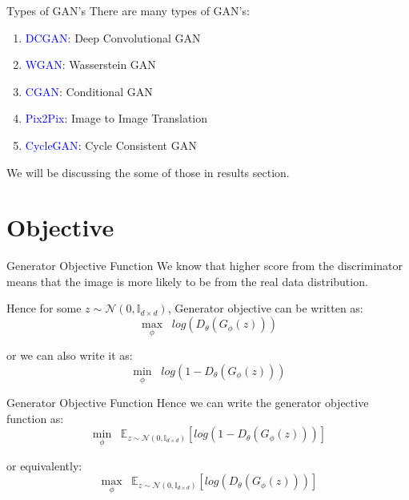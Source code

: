 \begin{frame}{Types of GAN's}
    There are many types of GAN's:
    \begin{enumerate}
        \item \textcolor{blue}{DCGAN}: Deep Convolutional GAN
        \item \textcolor{blue}{WGAN}: Wasserstein GAN
        \item \textcolor{blue}{CGAN}: Conditional GAN
        \item \textcolor{blue}{Pix2Pix}: Image to Image Translation
        \item \textcolor{blue}{CycleGAN}: Cycle Consistent GAN
    \end{enumerate}
    We will be discussing the some of those in results section.
\end{frame}

\section*{Objective}
\begin{frame}{Generator Objective Function}
    We know that higher score from the discriminator means that the image is more likely to be from the real data distribution. \\

    \bigskip

    Hence for some $z \sim \mathcal{N}(0,\mathbb{I}_{d \times d})$, Generator objective can be written as:
    \begin{equation}
        \max_{\phi} \;\; log(D_{\theta}(G_{\phi}(z)))
    \end{equation}

    or we can also write it as:
    \begin{equation}
        \min_{\phi} \;\; log(1 - D_{\theta}(G_{\phi}(z)))
    \end{equation}
\end{frame}

\begin{frame}{Generator Objective Function}
    Hence we can write the generator objective function as:
    \begin{equation}
        \min_{\phi} \;\; \mathbb{E}_{z \sim \mathcal{N}(0,\mathbb{I}_{d \times d})} \left[ log(1 - D_{\theta}(G_{\phi}(z))) \right]
    \end{equation} 

    or equivalently:
    \begin{equation}
        \max_{\phi} \;\; \mathbb{E}_{z \sim \mathcal{N}(0,\mathbb{I}_{d \times d})} \left[ log(D_{\theta}(G_{\phi}(z))) \right]
    \end{equation}
\end{frame}

